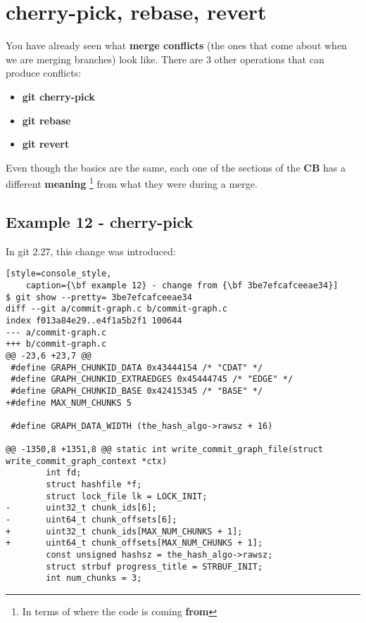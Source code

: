 
\section{cherry-pick, rebase, revert}
\label{other_ops}

You have already seen what {\bf merge conflicts} (the ones that come about when we are merging branches) look like.
There are 3 other operations that can produce conflicts:

\begin{itemize}
	\item {\bf git cherry-pick}
	\item {\bf git rebase }
	\item {\bf git revert}
\end{itemize}

Even though the basics are the same, each one of the sections of the {\bf CB} has a different {\bf meaning}
\footnote{In terms of where the code is coming {\bf from}} from what they were during a merge.

\subsection{Example 12 - cherry-pick}
\label{example_12}

In git 2.27, this change was introduced:
\begin{lstlisting}[style=console_style,
	caption={\bf example 12} - change from {\bf 3be7efcafceeae34}]
$ git show --pretty= 3be7efcafceeae34
diff --git a/commit-graph.c b/commit-graph.c
index f013a84e29..e4f1a5b2f1 100644
--- a/commit-graph.c
+++ b/commit-graph.c
@@ -23,6 +23,7 @@
 #define GRAPH_CHUNKID_DATA 0x43444154 /* "CDAT" */
 #define GRAPH_CHUNKID_EXTRAEDGES 0x45444745 /* "EDGE" */
 #define GRAPH_CHUNKID_BASE 0x42415345 /* "BASE" */
+#define MAX_NUM_CHUNKS 5
 
 #define GRAPH_DATA_WIDTH (the_hash_algo->rawsz + 16)
 
@@ -1350,8 +1351,8 @@ static int write_commit_graph_file(struct write_commit_graph_context *ctx)
        int fd;
        struct hashfile *f;
        struct lock_file lk = LOCK_INIT;
-       uint32_t chunk_ids[6];
-       uint64_t chunk_offsets[6];
+       uint32_t chunk_ids[MAX_NUM_CHUNKS + 1];
+       uint64_t chunk_offsets[MAX_NUM_CHUNKS + 1];
        const unsigned hashsz = the_hash_algo->rawsz;
        struct strbuf progress_title = STRBUF_INIT;
        int num_chunks = 3;
\end{lstlisting}

